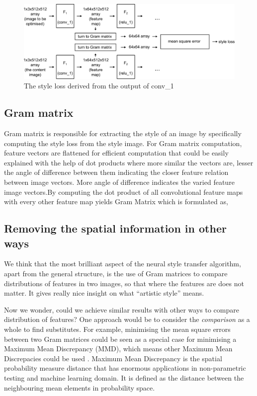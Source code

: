 \documentclass[runningheads]{llncs}
\begin{document}
\begin{figure}
\center
\includegraphics[width=\textwidth]{styleloss.pdf}
\caption{The style loss derived from the output of conv\_1 \label{styleloss}}
\end{figure}

\subsection{Gram matrix}
Gram matrix is responsible for extracting the style of an image by specifically computing the style loss 
from the style image. For Gram matrix computation, feature vectors are flattened for efficient computation 
that could be easily explained with the help of dot products where more similar the vectors are, lesser the 
angle of difference between them indicating the closer feature relation between image vectors. More angle of 
difference indicates the varied feature image vectors.By computing the dot product of all convolutional 
feature maps with every other feature map yields Gram Matrix which is formulated as, 




\subsection{Removing the spatial information in other ways}
We think that the most brilliant aspect of the neural style transfer algorithm,
apart from the general structure, is the use of Gram matrices to compare 
distributions of features in two images, so that where the features are does not matter.
It gives really nice insight on what ``artistic style'' means.

Now we wonder, could we achieve similar results with other ways to compare 
distribution of features?
One approach would be to consider the \emph{comparison} as a whole to find 
substitutes. 
For example, minimising the mean square errors between two Gram matrices could be seen as 
a special case for minimising a Maximum Mean Discrepancy (MMD), which means other Maximum Mean Discrepacies
could be used \cite{MMD}.
Maximum Mean Discrepancy is the spatial probability measure distance that has enormous applications in 
non-parametric testing and machine learning domain. It is defined as the distance between the neighbouring 
mean elements in probability space. 
\end{document}
